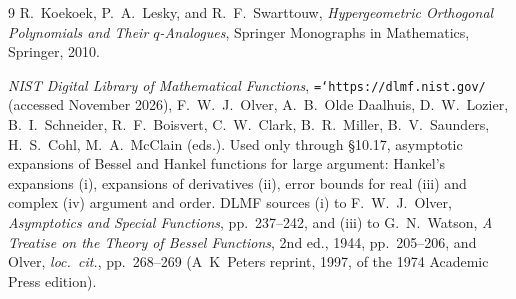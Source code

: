\documentclass[11pt]{article}
\theoremstyle{definition}
\theoremstyle{remark}
\renewcommand{\_}{\oldunderscore\penalty0\hskip0pt\relax}
\let\oldtexttt\texttt
\renewcommand{\texttt}[1]{\oldtexttt{\hyphenchar\font=`\-\relax #1}}
\begin{document}
\begin{thebibliography}{9}
R.~Koekoek, P.~A.~Lesky, and R.~F.~Swarttouw, \emph{Hypergeometric Orthogonal Polynomials and Their $q$-Analogues}, Springer Monographs in Mathematics, Springer, 2010.

\emph{NIST Digital Library of Mathematical Functions}, \texttt{https://dlmf.nist.gov/} (accessed November 2026), F.~W.~J.~Olver,
  A.~B.~Olde Daalhuis, D.~W.~Lozier, B.~I.~Schneider, R.~F.~Boisvert, C.~W.~Clark, B.~R.~Miller, B.~V.~Saunders, H.~S.~Cohl,
  M.~A.~McClain (eds.). Used only through \S10.17, asymptotic expansions of Bessel and Hankel functions for large argument:
  Hankel's expansions (i), expansions of derivatives (ii), error bounds for real (iii) and complex (iv) argument and order. DLMF
  sources (i) to F.~W.~J.~Olver, \emph{Asymptotics and Special Functions}, pp.~237--242, and (iii) to G.~N.~Watson, \emph{A
  Treatise on the Theory of Bessel Functions}, 2nd ed., 1944, pp.~205--206, and Olver, \emph{loc.\ cit.}, pp.~268--269
  (A~K~Peters reprint, 1997, of the 1974 Academic Press edition).

\end{thebibliography}
\end{document}
